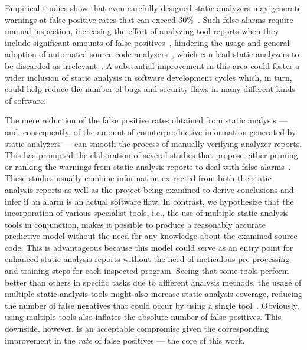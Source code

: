 Empirical studies show that even carefully designed static analyzers may
generate warnings at false positive rates that can exceed
30\%~\cite{kremenek2004correlation}. Such false alarms require manual
inspection, increasing the effort of analyzing tool reports when they include
significant amounts of false
positives~\cite{muske2013review,heckman2007adaptively}, hindering the usage and
general adoption of automated source code analyzers~\cite{johnson_why_2013},
which can lead static analyzers to be discarded as
irrelevant~\cite{kremenek2003z}.
A substantial improvement in this area could foster
a wider inclusion of static analysis in software development cycles which,
in turn, could help reduce the number of bugs and security flaws in many different
kinds of software.

The mere reduction of the false positive rates obtained from static analysis
--- and, consequently, of the amount of counterproductive information generated
by static analyzers --- can smooth the process of manually verifying analyzer
reports. This has prompted the elaboration of several studies that propose
either pruning or ranking the warnings from static analysis reports to deal
with false
alarms~\cite{ruthruff_predicting_2008,kremenek2004correlation,heckman2009model,jung2005taming}.
These studies usually combine information extracted from both the static
analysis reports as well as the project being examined to derive conclusions
and infer if an alarm is an actual software flaw. In contrast, we hypothesize
that the incorporation of various specialist tools, i.e., the use of multiple
static analysis tools in conjunction, makes it possible to produce a reasonably
accurate predictive model without the need for any knowledge about the examined
source code.  This is advantageous because this model could serve as an entry
point for enhanced static analysis reports without the need of meticulous
pre-processing and training steps for each inspected program. Seeing that some
tools perform better than others in specific tasks due to different analysis
methods, the usage of multiple static analysis tools might also increase static
analysis coverage, reducing the number of false negatives that could occur by
using a single tool~\cite{black2009static}. Obviously, using multiple tools
also inflates the absolute number of false positives. This downside, however,
is an acceptable compromise given the corresponding improvement in the
\emph{rate} of false positives --- the core of this work.

